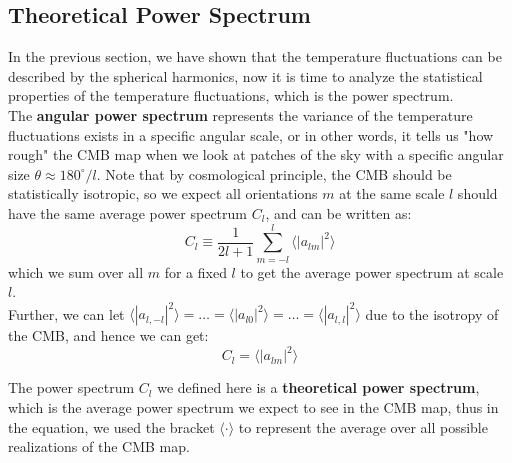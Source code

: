 \subsection{Theoretical Power Spectrum}
\begin{intuition}
    In the previous section, we have shown that the temperature fluctuations can be described by the spherical harmonics, now it is time to analyze the statistical properties of the temperature fluctuations, which is the power spectrum. \\

    The \textbf{angular power spectrum} represents the variance of the temperature fluctuations exists in a specific angular scale, or in other words, it tells us "how rough" the CMB map when we look at patches of the sky with a specific angular size $\theta \approx 180^\circ / l$. Note that by cosmological principle, the CMB should be statistically isotropic, so we expect all orientations $m$ at the same scale $l$ should have the same average power spectrum $C_l$, and can be written as:
    \[
        C_l \equiv \frac{1}{2l + 1} \sum_{m=-l}^{l} \langle |a_{lm}|^2 \rangle
    \]
    which we sum over all $m$ for a fixed $l$ to get the average power spectrum at scale $l$. \\

    Further, we can let $\langle |a_{l,-l}|^2 \rangle = \dots = \langle |a_{l0}|^2 \rangle = \dots = \langle |a_{l,l}|^2 \rangle$ due to the isotropy of the CMB, and hence we can get:
    \[
        C_l = \langle |a_{lm}|^2 \rangle
    \]
\end{intuition}

\bigskip \noindent
\begin{remark}
    The power spectrum $C_l$ we defined here is a \textbf{theoretical power spectrum}, which is the average power spectrum we expect to see in the CMB map, thus in the equation, we used the bracket $\langle \cdot \rangle$ to represent the average over all possible realizations of the CMB map. 
\end{remark}

